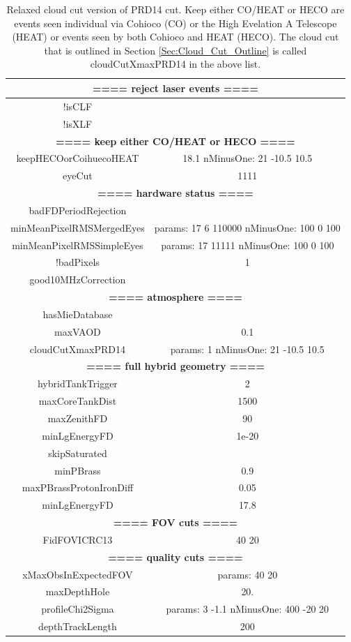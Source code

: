 \begin{table}
\centering
\begin{tabular}{|c c|}
\hline 
\multicolumn{2}{|c|}{\textbf{==== reject laser events ====}} \\ \hline
!isCLF & \\
!isXLF & \\
\hline
\multicolumn{2}{|c|}{\textbf{==== keep either CO/HEAT or HECO ====}} \\ \hline
keepHECOorCoihuecoHEAT & 18.1 { nMinusOne: 21  -10.5 10.5 } \\
eyeCut & 1111 \\
\hline
\multicolumn{2}{|c|}{\textbf{==== hardware status ====}} \\ \hline
badFDPeriodRejection & \\
minMeanPixelRMSMergedEyes & {  params: 17 6 110000 nMinusOne: 100  0 100 } \\
minMeanPixelRMSSimpleEyes & {  params: 17 11111 nMinusOne: 100  0 100 } \\
!badPixels  &               1 \\
good10MHzCorrection & \\
\hline
\multicolumn{2}{|c|}{\textbf{==== atmosphere ====}} \\ \hline
hasMieDatabase & \\
maxVAOD & 0.1 \\
cloudCutXmaxPRD14  & { params: 1 nMinusOne: 21  -10.5 10.5 } \\
\hline
\multicolumn{2}{|c|}{\textbf{==== full hybrid geometry ====}} \\ \hline
hybridTankTrigger &       2 \\
maxCoreTankDist & 1500 \\
maxZenithFD       &        90 \\
minLgEnergyFD    &        1e-20 \\
skipSaturated & \\
minPBrass         &        0.9 \\
maxPBrassProtonIronDiff &  0.05 \\
minLgEnergyFD     &       17.8 \\
\hline
\multicolumn{2}{|c|}{\textbf{==== FOV cuts ====}} \\ \hline
FidFOVICRC13 & 40 20 \\
\hline
\multicolumn{2}{|c|}{\textbf{==== quality cuts ====}} \\ \hline
xMaxObsInExpectedFOV & { params: 40 20 } \\
maxDepthHole    &     20. \\
profileChi2Sigma  &  {  params:  3 -1.1 nMinusOne: 400  -20 20 } \\
depthTrackLength   &  200 \\ \hline
\end{tabular}
\caption{Relaxed cloud cut version of PRD14 cut. Keep either CO/HEAT or HECO are events seen individual via Cohioco (CO) or the High Evelation A Telescope (HEAT) or events seen by both Cohioco and HEAT (HECO). The cloud cut that is outlined in Section \ref{Sec:Cloud_Cut_Outline} is called cloudCutXmaxPRD14 in the above list.} \label{tab:Quality_Cuts}
\end{table}


